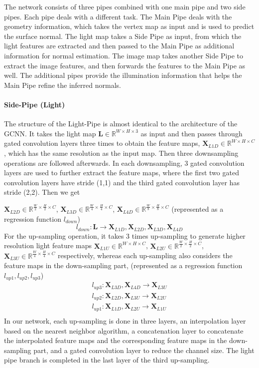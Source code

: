 The network consists of three pipes combined with one main pipe and two side pipes. Each pipe deals with a different task. The Main Pipe deals with the geometry information, which takes the vertex map as input and is used to predict the surface normal. The light map takes a Side Pipe as input, from which the light features are extracted and then passed to the Main Pipe as additional information for normal estimation. The image map takes another Side Pipe to extract the image features, and then forwards the features to the Main Pipe as well. The additional pipes provide the illumination information that helps the Main Pipe refine the inferred normals.

\paragraph{Side-Pipe (Light)}
 The structure of the Light-Pipe is almost identical to the architecture of the GCNN. It takes the light map $ \textbf{L} \in \mathbb{R}^{W\times H\times 3}$ as input and then passes through gated convolution layers three times to obtain the feature maps,
 $ \textbf{X}_{L1D} \in \mathbb{R}^{{W}\times H\times C} $,
 which has the same resolution as the input map.
 Then three downsampling operations are followed afterwards. In each downsampling, 3 gated convolution layers are used to further extract the feature maps, where the first two gated convolution layers have stride (1,1) and the third gated convolution layer has stride (2,2). Then we get
  
$ \textbf{X}_{L2D} \in \mathbb{R}^{\frac{W}{2}\times \frac{H}{2}\times C} $,
$ \textbf{X}_{L3D} \in \mathbb{R}^{\frac{W}{4}\times \frac{H}{4}\times C} $,
$ \textbf{X}_{L4D} \in \mathbb{R}^{\frac{W}{8}\times \frac{H}{8}\times C} $
(represented as a regression function $ l_{down} $)
\[ l_{down}: \textbf{L} \rightarrow  \textbf{X}_{L1D} , \textbf{X}_{L2D}, \textbf{X}_{L3D}, \textbf{X}_{L4D} \]
For the up-sampling operation, it takes 3 times up-sampling to generate higher resolution light feature maps
$ \textbf{X}_{L1U} \in \mathbb{R}^{{W}\times {H}\times C} $,
$ \textbf{X}_{L2U} \in \mathbb{R}^{\frac{W}{2}\times \frac{H}{2}\times C} $,
$ \textbf{X}_{L3U} \in \mathbb{R}^{\frac{W}{4}\times \frac{H}{4}\times C} $ respectively, whereas each up-sampling also considers the feature maps in the down-sampling part,
(represented as a regression function $ l_{up1}, l_{up2}, l_{up3} $)
\[ 
\begin{matrix}
	l_{up3} : \textbf{X}_{L3D}, \textbf{X}_{L4D} \rightarrow \textbf{X}_{L3U} \\
	l_{up2} : \textbf{X}_{L2D}, \textbf{X}_{L3U} \rightarrow \textbf{X}_{L2U} \\
	l_{up1} : \textbf{X}_{L1D}, \textbf{X}_{L2U} \rightarrow \textbf{X}_{L1U} \\
\end{matrix}
\]
In our network, each up-sampling is done in three layers, an interpolation layer based on the nearest neighbor algorithm, a concatenation layer to concatenate the interpolated feature maps and the corresponding feature maps in the down-sampling part, and a gated convolution layer to reduce the channel size.
The light pipe branch is completed in the last layer of the third up-sampling.

